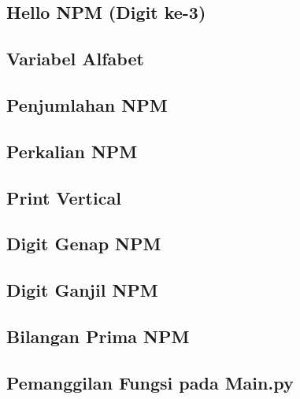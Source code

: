 \subsection{Hello NPM (Digit ke-3)}

\subsection{Variabel Alfabet}

\subsection{Penjumlahan NPM}

\subsection{Perkalian NPM}

\subsection{Print Vertical}

\subsection{Digit Genap NPM}

\subsection{Digit Ganjil NPM}

\subsection{Bilangan Prima NPM}

\subsection{Pemanggilan Fungsi pada Main.py}



